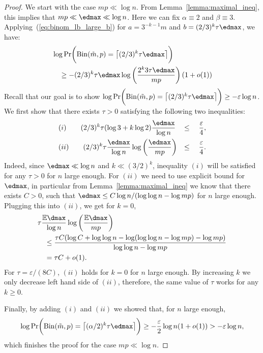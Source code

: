\begin{proof}
    \noindent
    We start with the case \(mp \ll \log n\). From Lemma~\ref{lemma:maximal_ineq}, this implies that \(mp \ll \edmax \ll \log n\). Here we can fix \(\alpha \equiv 2\) and \(\beta \equiv 3\). Applying~(\ref{eq:binom_lb_large_b}) for \(a = 3^{-k-1}m\) and \(b = (2/3)^k \tau \edmax\), we have:
    \begin{align*}
        &\log \Pr\biggl(\mathrm{Bin}(\tilde m, p) = \bigl\lceil (2/3)^k \tau \edmax\bigr\rceil \biggr) \\
        &\quad \geq - (2/3)^k \tau \edmax \log \left(\frac{2^k 3 \tau \edmax}{ mp}\right) (1 + o(1))
    \end{align*}
    Recall that our goal is to show \(\log \Pr\biggl(\mathrm{Bin}(\tilde m, p) = \bigl\lceil (2/3)^k \tau \edmax\bigr\rceil \biggr) \geq -\varepsilon \log n\). We first show that there exists \(\tau > 0\) satisfying the following two inequalities:
    \begin{equation}
    \begin{aligned}
        &(i) \qquad (2/3)^k \tau (\log 3 + k \log 2 ) \frac{\edmax}{\log n} &\leq \quad \frac{\varepsilon}{4}, \\
        &(ii) \qquad (2/3)^k \tau \frac{\edmax}{\log n} \log \left(\frac{\edmax}{mp}\right) &\leq \quad \frac{\varepsilon}{4}.
    \end{aligned}
    \end{equation}
    Indeed, since \(\edmax \ll \log n\) and \(k \ll (3/2)^k\), inequality \((i)\) will be satisfied for any \(\tau > 0\) for \(n\) large enough. 
    For \((ii)\) we need to use explicit bound for \(\edmax\), in particular from Lemma~\ref{lemma:maximal_ineq} we know that there exists \(C > 0\), such that \(\edmax \leq C \log n / (\log \log n - \log mp)\) for \(n\) large enough. 
    Plugging this into \((ii)\), we get for \(k = 0\),
    \begin{align*}
        &\tau \frac{\mathbb{E}\dmax}{\log n}\log\left(\frac{\mathbb{E}\dmax}{mp}\right) \\
        &\quad \leq \frac{\tau C (\log C + \log \log n - \log (\log \log n - \log mp) - \log mp)}{\log \log n - \log mp} \\
        &\quad = \tau C + o(1).
    \end{align*}
    For \(\tau = \varepsilon / (8C)\), \((ii)\) holds for \(k = 0\) for \(n\) large enough. By increasing \(k\) we only decrease left hand side of \((ii)\), therefore, the same value of \(\tau\) works for any \(k \geq 0\). 

    \noindent
    Finally, by adding \((i)\) and \((ii)\) we showed that, for \(n\) large enough, 
    \begin{equation*}
    \log \Pr\biggl(\mathrm{Bin}(\tilde m, p) = \bigl\lceil (\alpha/2)^k \tau \edmax\bigr\rceil \biggr) \geq - \frac{\varepsilon}{2}\log n (1 + o(1)) > -\varepsilon \log n,
    \end{equation*}
    which finishes the proof for the case \(mp \ll \log n\).


\end{proof}
